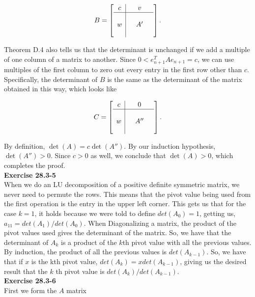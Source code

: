 \documentclass{article}
\begin{document}
\[ B = \left[ \begin{array}{c|ccc}  c &  & v & \\ \hline & & & \\  w & & A' &  \\ & &  & \\ \end{array} \right]. \]

Theorem D.4 also tells us that  the determinant is unchanged if we add a multiple of one column of a matrix to another.  Since $0 < e_{n+1}^T A e_{n+1} = c$, we can use multiples of the first column to zero out every entry in the first row other than $c$.  Specifically, the determinant of $B$ is the same as the determinant of the matrix obtained in this way, which looks like

\[C = \left[ \begin{array}{c|ccc}  c &  & 0 & \\ \hline & & & \\  w & & A'' &  \\ & &  & \\ \end{array} \right]. \]

By definition, $\det(A) = c\det(A'')$.  By our induction hypothesis, $\det(A'') > 0$.  Since $c > 0$ as well, we conclude that $\det(A) > 0$, which completes the proof. \\

\noindent\textbf{Exercise 28.3-5}\\
When we do an LU decomposition of a positive definite symmetric matrix, we never need to permute the rows. This means that the pivot value being used from the first operation is the entry in the upper left corner. This gets us that for the case $k=1$, it holds because we were told to define $det(A_0) =1$, getting us, $a_{11} = det(A_1)/det(A_0)$. When Diagonalizing a matrix, the product of the pivot values used gives the determinant of the matrix. So, we have that the determinant of $A_k$ is a product of the $k$th pivot value with all the previous values. By induction, the product of all the previous values is $det(A_{k-1})$. So, we have that if $x$ is the kth pivot value, $det(A_k) = x det(A_{k-1})$, giving us the desired result that the $k$ th pivot value is $det(A_{k})/det(A_{k-1})$.\\



\noindent\textbf{Exercise 28.3-6}\\

First we form the $A$ matrix 
\end{document}

